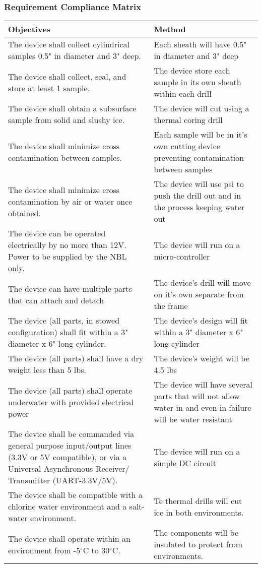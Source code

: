 \documentclass{article}
\begin{document}
\subsubsection{Requirement Compliance Matrix}
\begin{center}
    \begin{tabulary}{\linewidth}{|L|L|}
    \hline
    Objectives & Method \\
    \hline
    The device shall collect cylindrical samples 0.5" in diameter and 3" deep. &
    Each sheath will have 0.5" in diameter and 3" deep \\
    \hline
    The device shall collect, seal, and store at least 1 sample. &
    The device store each sample in its own sheath within each drill \\
    \hline
    The device shall obtain a subsurface sample from solid and slushy ice. &
    The device will cut using a thermal coring drill \\
    \hline
    The device shall minimize cross contamination between samples. &
    Each sample will be in it's own cutting device preventing contamination between samples \\
    \hline
    The device shall minimize cross contamination by air or water once obtained. &
    The device will use psi to push the drill out and in the process keeping water out \\
    \hline
    The device can be operated electrically by no more than 12V. Power to be supplied by the NBL only. &
    The device will run on a micro-controller \\
    \hline
    The device can have multiple parts that can attach and detach &
    The device's drill will move on it's own separate from the frame \\
    \hline
    The device (all parts, in stowed configuration) shall fit within a 3" diameter x 6" long cylinder. &
    The device's design will fit within a 3" diameter x 6" long cylinder \\
    \hline
    The device (all parts) shall have a dry weight less than 5 lbs. &
    The device's weight will be 4.5 lbs\\
    \hline
    The device (all parts) shall operate underwater with provided electrical power &
    The device will have several parts that will not allow water in and even in failure will be water resistant \\
    \hline
    The device shall be commanded via general purpose input/output lines (3.3V or 5V compatible), or via a Universal Asynchronous Receiver/ Transmitter (UART-3.3V/5V). & 
    The device will run on a simple DC circuit\\
    \hline
    The device shall be compatible with a chlorine water environment and a salt-water environment. & 
    Te thermal drills will cut ice in both environments.\\
    \hline
    The device shall operate within an environment from -5$^\circ$C to 30$^\circ$C. &
    The components will be insulated to protect from environments. \\
    \hline
    \end{tabulary}
\end{center}
\end{document}

